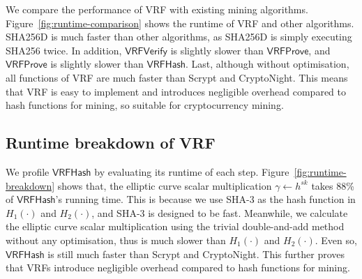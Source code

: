 We compare the performance of VRF with existing mining algorithms.
Figure~\ref{fig:runtime-comparison} shows the runtime of VRF and other algorithms.
SHA256D is much faster than other algorithms, as SHA256D is simply executing SHA256 twice.
In addition, $\mathsf{VRFVerify}$ is slightly slower than $\mathsf{VRFProve}$, and $\mathsf{VRFProve}$ is slightly slower than $\mathsf{VRFHash}$.
Last, although without optimisation, all functions of VRF are much faster than Scrypt and CryptoNight.
This means that VRF is easy to implement and introduces negligible overhead compared to hash functions for mining, so suitable for cryptocurrency mining.



\subsection{Runtime breakdown of VRF}

We profile $\mathsf{VRFHash}$ by evaluating its runtime of each step.
Figure~\ref{fig:runtime-breakdown} shows that, the elliptic curve scalar multiplication $\gamma \gets h^{sk}$ takes 88\% of $\mathsf{VRFHash}$'s running time.
This is because we use SHA-3 as the hash function in $H_1(\cdot)$ and $H_2(\cdot)$, and SHA-3 is designed to be fast.
Meanwhile, we calculate the elliptic curve scalar multiplication using the trivial double-and-add method without any optimisation, thus is much slower than $H_1(\cdot)$ and $H_2(\cdot)$.
Even so, $\mathsf{VRFHash}$ is still much faster than Scrypt and CryptoNight.
This further proves that VRFs introduce negligible overhead compared to hash functions for mining.
